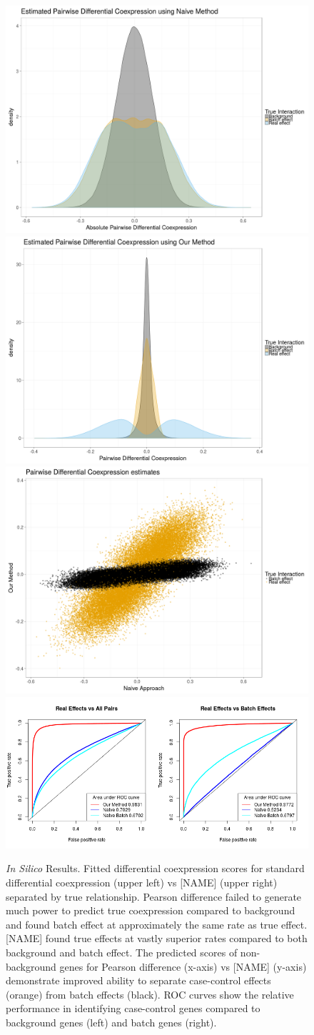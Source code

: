 \begin{figure}
\begin{center}
\includegraphics[width=.5\columnwidth]{figures/NaiveDensity.png}
\includegraphics[width=.5\columnwidth]{figures/ourMethodDensity.png}
\\
\includegraphics[width=.5\columnwidth]{figures/OursVsNaive.png}
\includegraphics[width=.5\columnwidth]{figures/OursVsOthersROC.png}
\end{center}\caption[Comparison of methods for differential coexpression estimates]{\emph{In Silico} Results. Fitted differential coexpression scores
for standard differential coexpression (upper left) vs {[}NAME{]}
(upper right) separated by true relationship. Pearson difference failed
to generate much power to predict true coexpression compared to background
and found batch effect at approximately the same rate as true effect.
{[}NAME{]} found true effects at vastly superior rates compared to
both background and batch effect. The predicted scores of non-background
genes for Pearson difference (x-axis) vs {[}NAME{]} (y-axis) demonstrate
improved ability to separate case-control effects (orange) from batch
effects (black). ROC curves show the relative performance in identifying
case-control genes compared to background genes (left) and batch genes
(right).}
\label{fig:insilico_results}
\end{figure}


